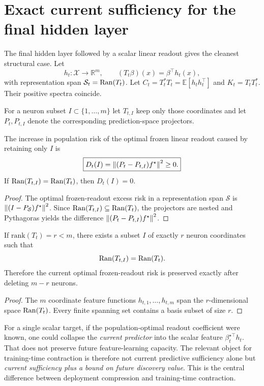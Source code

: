 \section{Exact current sufficiency for the final hidden layer}
The final hidden layer followed by a scalar linear readout gives the cleanest structural case. Let
\[
h_t:\mathcal X\to\mathbb R^m,
\qquad
(T_t\beta)(x)=\beta^\top h_t(x),
\]
with representation span $\mathcal S_t=\mathrm{Ran}(T_t)$. Let $C_t=T_t^\ast T_t=\mathbb E[h_th_t^\top]$ and $K_t=T_tT_t^\ast$. Their positive spectra coincide.

For a neuron subset $I\subset\{1,\ldots,m\}$ let $T_{t,I}$ keep only those coordinates and let $P_t,P_{t,I}$ denote the corresponding prediction-space projectors.

\begin{proposition}\label{prop:neuron-cost}
The increase in population risk of the optimal frozen linear readout caused by retaining only $I$ is
\[
\boxed{
D_t(I)=\left\lVert (P_t-P_{t,I})f^\star\right\rVert^2\ge0.}
\]
If $\mathrm{Ran}(T_{t,I})=\mathrm{Ran}(T_t)$, then $D_t(I)=0$.
\end{proposition}

\begin{proof}
The optimal frozen-readout excess risk in a representation span $\mathcal S$ is
$\left\lVert (I-P_\mathcal S)f^\star\right\rVert^2$. Since $\mathrm{Ran}(T_{t,I})\subseteq\mathrm{Ran}(T_t)$, the projectors are nested and Pythagoras yields the difference $\left\lVert (P_t-P_{t,I})f^\star\right\rVert^2$.
\end{proof}

\begin{theorem}\label{thm:subset-basis}
If $\mathrm{rank}(T_t)=r< m$, there exists a subset $I$ of exactly $r$ neuron coordinates such that
\[
\mathrm{Ran}(T_{t,I})=\mathrm{Ran}(T_t).
\]
Therefore the current optimal frozen-readout risk is preserved exactly after deleting $m-r$ neurons.
\end{theorem}

\begin{proof}
The $m$ coordinate feature functions $h_{t,1},\ldots,h_{t,m}$ span the $r$-dimensional space $\mathrm{Ran}(T_t)$. Every finite spanning set contains a basis subset of size $r$.
\end{proof}

\begin{remark}
For a single scalar target, if the population-optimal readout coefficient were known, one could collapse the \emph{current predictor} into the scalar feature $\beta_t^{\star\top}h_t$. That does not preserve future feature-learning capacity. The relevant object for training-time contraction is therefore not current predictive sufficiency alone but \emph{current sufficiency plus a bound on future discovery value}. This is the central difference between deployment compression and training-time contraction.
\end{remark}

